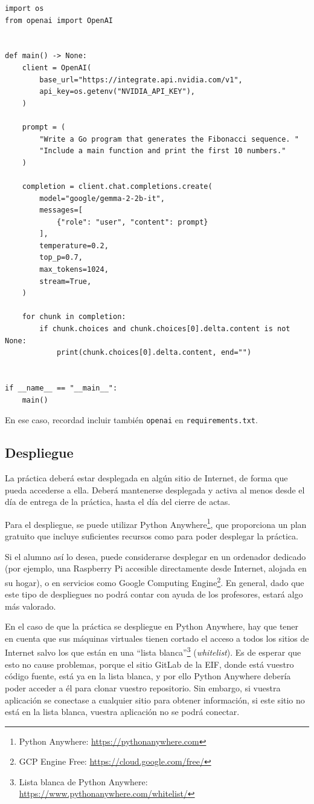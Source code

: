 \begin{verbatim}
import os
from openai import OpenAI


def main() -> None:
    client = OpenAI(
        base_url="https://integrate.api.nvidia.com/v1",
        api_key=os.getenv("NVIDIA_API_KEY"),
    )

    prompt = (
        "Write a Go program that generates the Fibonacci sequence. "
        "Include a main function and print the first 10 numbers."
    )

    completion = client.chat.completions.create(
        model="google/gemma-2-2b-it",
        messages=[
            {"role": "user", "content": prompt}
        ],
        temperature=0.2,
        top_p=0.7,
        max_tokens=1024,
        stream=True,
    )

    for chunk in completion:
        if chunk.choices and chunk.choices[0].delta.content is not None:
            print(chunk.choices[0].delta.content, end="")


if __name__ == "__main__":
    main()
\end{verbatim}

En ese caso, recordad incluir también \verb|openai| en \verb|requirements.txt|.

\subsection{Despliegue}
\label{sec:practica-2026-05:despliegue}

La práctica deberá estar desplegada en algún sitio de Internet, de forma que pueda accederse a ella. Deberá mantenerse desplegada y activa al menos desde el día de entrega de la práctica, hasta el día del cierre de actas.

Para el despliegue, se puede utilizar Python Anywhere\footnote{Python Anywhere: \url{https://pythonanywhere.com}}, que proporciona un plan gratuito que incluye suficientes recursos como para poder desplegar la práctica.

Si el alumno así lo desea, puede considerarse desplegar en un ordenador dedicado (por ejemplo, una Raspberry Pi accesible directamente desde Internet, alojada en su hogar), o en servicios como Google Computing Engine\footnote{GCP Engine Free: \url{https://cloud.google.com/free/}}. En general, dado que este tipo de despliegues no podrá contar con ayuda de los profesores, estará algo más valorado.

En el caso de que la práctica se despliegue en Python Anywhere, hay que tener en cuenta que sus máquinas virtuales tienen cortado el acceso a todos los sitios de Internet salvo los que están en una ``lista blanca''\footnote{Lista blanca de Python Anywhere: \url{https://www.pythonanywhere.com/whitelist/}} (\emph{whitelist}). Es de esperar que esto no cause problemas, porque el sitio GitLab de la EIF, donde está vuestro código fuente, está ya en la lista blanca, y por ello Python Anywhere debería poder acceder a él para clonar vuestro repositorio. Sin embargo, si vuestra aplicación se conectase a cualquier sitio para obtener información, si este sitio no está en la lista blanca, vuestra aplicación no se podrá conectar.


